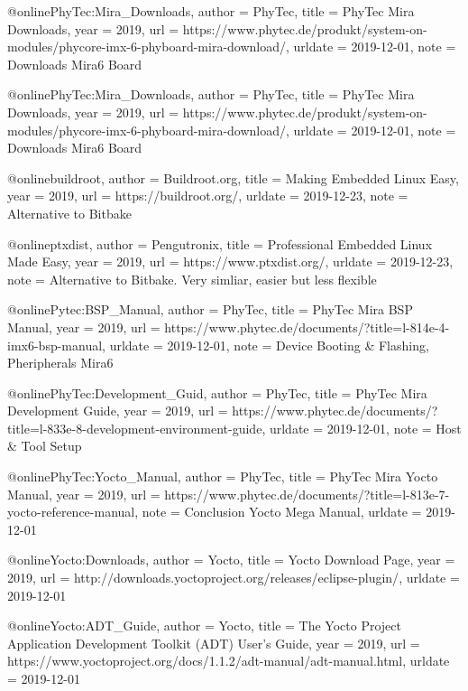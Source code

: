 @online{PhyTec:Mira_Downloads,
author = {PhyTec},
title = {{PhyTec Mira} Downloads},
year = 2019,
url = {https://www.phytec.de/produkt/system-on-modules/phycore-imx-6-phyboard-mira-download/},
urldate = {2019-12-01},
note = {Downloads Mira6 Board}
}




@online{PhyTec:Mira_Downloads,
author = {PhyTec},
title = {{PhyTec Mira} Downloads},
year = 2019,
url = {https://www.phytec.de/produkt/system-on-modules/phycore-imx-6-phyboard-mira-download/},
urldate = {2019-12-01},
note = {Downloads Mira6 Board}
}

@online{buildroot,
author = {Buildroot.org},
title = {Making Embedded Linux Easy},
year = 2019,
url =  {https://buildroot.org/},
urldate = {2019-12-23},
note = {Alternative to Bitbake}
}

@online{ptxdist,
    author = {Pengutronix},
    title = {Professional Embedded Linux Made Easy},
    year = 2019,
    url = {https://www.ptxdist.org/},
    urldate = {2019-12-23},
    note = { Alternative to Bitbake. Very simliar, easier but less flexible}
}



@online{Pytec:BSP_Manual,
author = {PhyTec},
title = {{PhyTec Mira} BSP Manual},
year = 2019,
url = {https://www.phytec.de/documents/?title=l-814e-4-imx6-bsp-manual},
urldate = {2019-12-01},
note = {Device Booting \& Flashing, Pheripherals Mira6}
}

@online{PhyTec:Development_Guid,
author = {PhyTec},
title = {{PhyTec Mira} Development Guide},
year = 2019,
url = {https://www.phytec.de/documents/?title=l-833e-8-development-environment-guide},
urldate = {2019-12-01},
note = {Host \& Tool Setup}
}


@online{PhyTec:Yocto_Manual,
author = {PhyTec},
title = {{PhyTec Mira} Yocto Manual},
year = 2019,
url = {https://www.phytec.de/documents/?title=l-813e-7-yocto-reference-manual},
note = {Conclusion Yocto Mega Manual},
urldate = {2019-12-01}
}



@online{Yocto:Downloads,
author = {Yocto},
title = {{Yocto} Download Page},
year = 2019,
url = {http://downloads.yoctoproject.org/releases/eclipse-plugin/},
urldate = {2019-12-01}
}


@online{Yocto:ADT_Guide,
author = {Yocto},
title = {The Yocto Project Application Development Toolkit (ADT) User's Guide},
year = 2019,
url = {https://www.yoctoproject.org/docs/1.1.2/adt-manual/adt-manual.html},
urldate = {2019-12-01}
}


